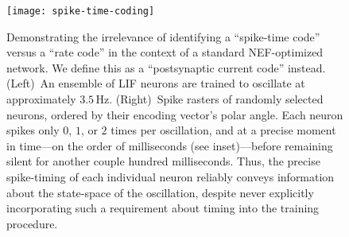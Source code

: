 \begin{figure}
    \centering
    \texttt{[image: spike-time-coding]}
     
    \caption{\label{fig:spike-time-coding} 
      Demonstrating the irrelevance of identifying a ``spike-time code'' versus a ``rate code'' in the context of a standard NEF-optimized network.
      We define this as a ``postsynaptic current code'' instead.
      (Left)~An ensemble of LIF neurons are trained to oscillate at approximately $3.5$\,Hz.
      (Right)~Spike rasters of  randomly selected neurons, ordered by their encoding vector's polar angle.
      Each neuron spikes only $0$, $1$, or $2$ times per oscillation, and at a precise moment in time---on the order of milliseconds (see inset)---before remaining silent for another couple hundred milliseconds.
      Thus, the precise spike-timing of each individual neuron reliably conveys information about the state-space of the oscillation, despite never explicitly incorporating such a requirement about timing into the training procedure.
    }
\end{figure}

